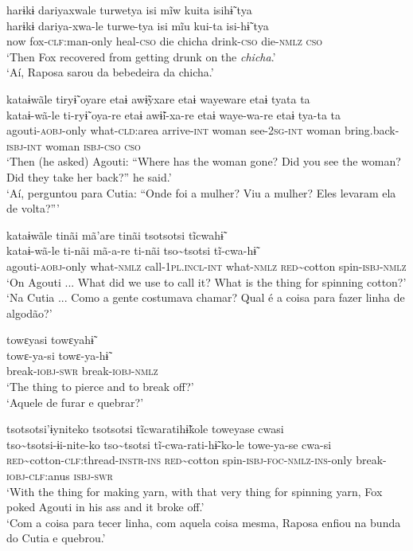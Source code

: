 \documentclass[output=paper,
modfonts,nonflat
]{langsci/langscibook}
\begin{document}
\ea harɨkɨ dariyaxwale turwetya isi mĩw kuita isihɨ̃ tya\\[.3em]
\gll harɨkɨ		dariya-xwa-le		turwe-tya	isi	mĩu	kui-ta		isi-hɨ̃		tya\\
now		fox-\textsc{clf}:man-only	heal-\textsc{cso}	die	chicha	drink-\textsc{cso}	die-\textsc{nmlz}	\textsc{cso}\\
\glt ‘Then Fox recovered from getting drunk on the \textit{chicha}.’\\
‘Aí, Raposa sarou da bebedeira da chicha.'
\z

\ea kataɨwãle tiryɨ̃ oyare etaɨ awɨ̃yxare etaɨ wayeware etaɨ tyata ta\\[.3em]
\gll kataɨ-wã-le		ti-ryɨ̃			oya-re		etaɨ		awɨ̃i-xa-re	etaɨ		waye-wa-re		etaɨ		tya-ta	ta\\
agouti-\textsc{aobj}-only	what-\textsc{cld}:area	arrive-\textsc{int}	woman	see-\textsc{2sg-int}	woman	bring.back-\textsc{isbj-int}	woman	\textsc{isbj-cso}	\textsc{cso}\\
\glt ‘Then (he asked) Agouti: “Where has the woman gone? Did you see the woman? Did they take her back?” he said.’\\
‘Aí, perguntou para Cutia: “Onde foi a mulher? Viu a mulher? Eles levaram ela de volta?”'
\z

\ea kataɨwãle tinãi mã'are tinãi tsotsotsi tĩcwahɨ̃\\[.3em]
\gll kataɨ-wã-le		ti-nãi		mã-a-re		ti-nãi		tso\textasciitilde tsotsi		tĩ-cwa-hɨ̃\\
agouti-\textsc{aobj}-only	what-\textsc{nmlz}	call-\textsc{1pl.incl-int}	what-\textsc{nmlz}	\textsc{red}\textasciitilde cotton	spin-\textsc{isbj-nmlz}\\
\glt ‘On Agouti ... What did we use to call it? What is the thing for spinning cotton?’\\
‘Na Cutia ... Como a gente costumava chamar? Qual é a coisa para fazer linha de algodão?'
\z

\ea towɛyasi towɛyahɨ̃\\[.3em]
\gll towɛ-ya-si	towɛ-ya-hɨ̃\\
break-\textsc{iobj-swr}	break-\textsc{iobj-nmlz}\\
 ‘The thing to pierce and to break off?’\\
 ‘Aquele de furar e quebrar?'
\z

\ea tsotsotsi'ɨyniteko tsotsotsi tĩcwaratihɨ̃kole toweyase cwasi\\[.3em]
\gll tso\textasciitilde tsotsi-ɨi-nite-ko					tso\textasciitilde tsotsi		tĩ-cwa-rati-hɨ̃-ko-le			towe-ya-se			cwa-si\\
\textsc{red}\textasciitilde cotton-\textsc{clf}:thread-\textsc{instr-ins}	\textsc{red}\textasciitilde cotton	spin-\textsc{isbj-foc-nmlz-ins}-only	break-\textsc{iobj-clf}:anus	\textsc{isbj-swr}\\
\glt ‘With the thing for making yarn, with that very thing for spinning yarn, Fox poked Agouti in his ass and it broke off.’\\
‘Com a coisa para tecer linha, com aquela coisa mesma, Raposa enfiou na bunda do Cutia e quebrou.'
\z
\end{document}
